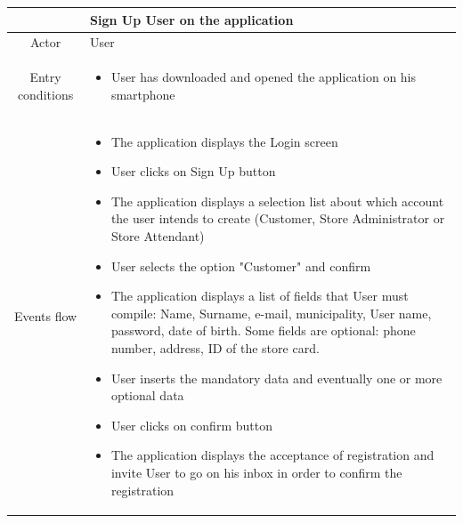 \documentclass[table, 12pt]{article}
\begin{document}
\begin{longtable}{ | c | p{10cm} | }

    \hline
                     & Sign Up User on the application                                                                                                                                                                                                                                        \\
    \hline
    Actor            & User                                                                                                                                                                                                                                                                   \\
    \hline
    Entry conditions &
    \begin{itemize}
        \item User has downloaded and opened the application on his smartphone
    \end{itemize}                                                                                                                                                                                                                                                                \\
    \hline
    Events flow      & \begin{itemize}[nosep,after=\strut]
        \item The application displays the Login screen
        \item User clicks on Sign Up button
        \item The application displays a selection list about which account the user intends to create (Customer, Store Administrator or Store Attendant)
        \item User selects the option "Customer" and confirm
        \item The application displays a list of fields that User must compile: Name, Surname, e-mail, municipality, User name, password, date of birth. Some fields are optional: phone number, address, ID of the store card.
        \item User inserts the mandatory data and eventually one or more optional data
        \item User clicks on confirm button
        \item The application displays the acceptance of registration and invite User to go on his inbox in order to confirm the registration

\end{itemize}
\end{longtable}
\end{document}
